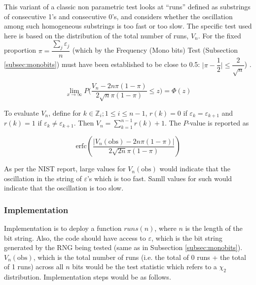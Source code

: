 This variant of a classic non parametric test looks at “runs” defined as substrings of consecutive 1's and consecutive 0's, and considers whether the oscillation among such homogeneous substrings is too fast or too slow. The specific test used here is based on the distribution of the total number of runs, $V_n$. For the fixed proportion $\pi = \dfrac{\sum_j \varepsilon_j}{n}$ (which by the Frequency (Mono bits) Test (Subsection \ref{subsec:monobits}) must have been established to be close to 0.5: $\lvert \pi - \dfrac{1}{2} \rvert \leq \dfrac{2}{\sqrt{n}}$) \cite{rep_nist_sp_80022}.

\[
        \lim_{x\to\infty} P \bigg(\dfrac{V_n - 2n\pi(1-\pi)}{2\sqrt{n}\pi(1-\pi)} \leq z\bigg) = \Phi(z)
\]

To evaluate $V_n$, define for $k \in \mathbb{Z}_i; 1 \leq i \leq n-1$, $r(k) = 0$ if $\varepsilon_k = \varepsilon_{k+1}$ and $r(k) = 1$ if $\varepsilon_k \ne \varepsilon_{k+1}$. Then $V_n = \sum_{k=1}^{n-1}r(k) + 1$. The $P$-value is reported as

\[
    \text{erfc}(\dfrac{\lvert V_n(\text{obs}) - 2n\pi(1-\pi)\rvert}{2\sqrt{2n}\pi(1-\pi)})
\]

As per the NIST report, large values for $V_n(\text{obs})$ would indicate that the oscillation in the string of $\varepsilon$'s which is too fast. Samll values for such would indicate that the oscillation is too slow.

\subsubsection{Implementation}

Implementation is to deploy a function $runs(n)$, where $n$ is the length of the bit string. Also, the code should have access to $\varepsilon$, which is the bit string generated by the RNG being tested (same as in Subsection \ref{subsec:monobits}). $V_n(\text{obs})$, which is the total number of runs (i.e. the total of 0 runs + the total of 1 runs) across all $n$ bits would be the test statistic which refers to a $\chi_2$ distribution. Implementation steps would be as follows.

